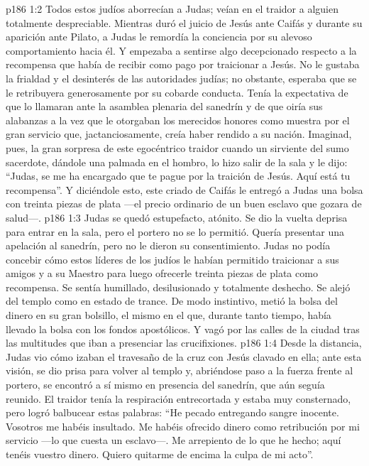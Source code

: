 \vs p186 1:2 Todos estos judíos aborrecían a Judas; veían en el traidor a alguien totalmente despreciable. Mientras duró el juicio de Jesús ante Caifás y durante su aparición ante Pilato, a Judas le remordía la conciencia por su alevoso comportamiento hacia él. Y empezaba a sentirse algo decepcionado respecto a la recompensa que había de recibir como pago por traicionar a Jesús. No le gustaba la frialdad y el desinterés de las autoridades judías; no obstante, esperaba que se le retribuyera generosamente por su cobarde conducta. Tenía la expectativa de que lo llamaran ante la asamblea plenaria del sanedrín y de que oiría sus alabanzas a la vez que le otorgaban los merecidos honores como muestra por el gran servicio que, jactanciosamente, creía haber rendido a su nación. Imaginad, pues, la gran sorpresa de este egocéntrico traidor cuando un sirviente del sumo sacerdote, dándole una palmada en el hombro, lo hizo salir de la sala y le dijo: “Judas, se me ha encargado que te pague por la traición de Jesús. Aquí está tu recompensa”. Y diciéndole esto, este criado de Caifás le entregó a Judas una bolsa con treinta piezas de plata ---el precio ordinario de un buen esclavo que gozara de salud---.
\vs p186 1:3 Judas se quedó estupefacto, atónito. Se dio la vuelta deprisa para entrar en la sala, pero el portero no se lo permitió. Quería presentar una apelación al sanedrín, pero no le dieron su consentimiento. Judas no podía concebir cómo estos líderes de los judíos le habían permitido traicionar a sus amigos y a su Maestro para luego ofrecerle treinta piezas de plata como recompensa. Se sentía humillado, desilusionado y totalmente deshecho. Se alejó del templo como en estado de trance. De modo instintivo, metió la bolsa del dinero en su gran bolsillo, el mismo en el que, durante tanto tiempo, había llevado la bolsa con los fondos apostólicos. Y vagó por las calles de la ciudad tras las multitudes que iban a presenciar las crucifixiones.
\vs p186 1:4 Desde la distancia, Judas vio cómo izaban el travesaño de la cruz con Jesús clavado en ella; ante esta visión, se dio prisa para volver al templo y, abriéndose paso a la fuerza frente al portero, se encontró a sí mismo en presencia del sanedrín, que aún seguía reunido. El traidor tenía la respiración entrecortada y estaba muy consternado, pero logró balbucear estas palabras: “He pecado entregando sangre inocente. Vosotros me habéis insultado. Me habéis ofrecido dinero como retribución por mi servicio ---lo que cuesta un esclavo---. Me arrepiento de lo que he hecho; aquí tenéis vuestro dinero. Quiero quitarme de encima la culpa de mi acto”.
